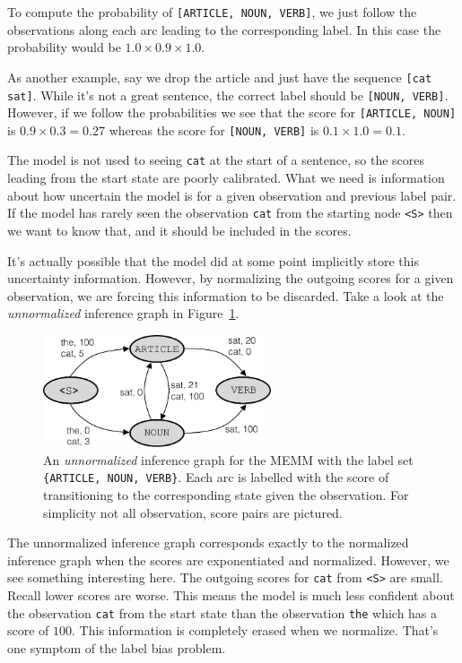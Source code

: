 \documentclass[11pt, letterpaper]{article}
\begin{document}
To compute the probability of \texttt{[ARTICLE, NOUN, VERB]}, we just follow the
observations along each arc leading to the corresponding label. In this case
the probability would be $1.0\!\times\!0.9\!\times\!1.0$.

As another example, say we drop the article and just have the sequence
\texttt{[cat sat]}. While it's not a great sentence, the correct label should
be \texttt{[NOUN, VERB]}. However, if we follow the probabilities we see that
the score for \texttt{[ARTICLE, NOUN]} is $0.9\!\times\!0.3\!=\!0.27$ whereas
the score for \texttt{[NOUN, VERB]} is $0.1\!\times\!1.0\!=\!0.1$.

The model is not used to seeing \texttt{cat} at the start of a sentence, so the
scores leading from the start state are poorly calibrated. What we need is
information about how uncertain the model is for a given observation and
previous label pair. If the model has rarely seen the observation \texttt{cat}
from the starting node \texttt{<S>} then we want to know that, and it should be
included in the scores.

It's actually possible that the model did at some point implicitly store this
uncertainty information. However, by normalizing the outgoing scores for a
given observation, we are forcing this information to be discarded. Take a look
at the \emph{unnormalized} inference graph in Figure~\ref{fig:memm_inf_unnorm}.

\begin{figure}
    \centering
    \includegraphics[width=0.6\textwidth]{figures/memm_inference_unnormalized.pdf}
    \caption{An \emph{unnormalized} inference graph for the MEMM with the label
    set \texttt{\{ARTICLE, NOUN, VERB\}}. Each arc is labelled with the score
    of transitioning to the corresponding state given the observation. For
    simplicity not all observation, score pairs are pictured.}
    \label{fig:memm_inf_unnorm}
\end{figure}

The unnormalized inference graph corresponds exactly to the normalized
inference graph when the scores are exponentiated and normalized. However, we
see something interesting here. The outgoing scores for \texttt{cat} from
\texttt{<S>} are small. Recall lower scores are worse. This means the model is
much less confident about the observation \texttt{cat} from the start state
than the observation \texttt{the} which has a score of $100$. This information
is completely erased when we normalize. That's one symptom of the label bias
problem.
\end{document}
